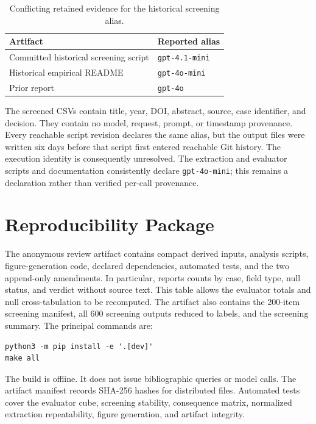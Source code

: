 \documentclass[acmsmall,anonymous,review]{acmart}
\begin{document}
\begin{table}[h]
\caption{Conflicting retained evidence for the historical screening alias.}
\label{tab:model-conflict}
\begin{tabularx}{\columnwidth}{Y l}
\toprule
\textbf{Artifact} & \textbf{Reported alias} \\
\midrule
Committed historical screening script & \texttt{gpt-4.1-mini} \\
Historical empirical README & \texttt{gpt-4o-mini} \\
Prior report & \texttt{gpt-4o} \\
\bottomrule
\end{tabularx}
\end{table}

The screened CSVs contain title, year, DOI, abstract, source, case identifier, and decision. They contain no model, request, prompt, or timestamp provenance. Every reachable script revision declares the same alias, but the output files were written six days before that script first entered reachable Git history. The execution identity is consequently unresolved. The extraction and evaluator scripts and documentation consistently declare \texttt{gpt-4o-mini}; this remains a declaration rather than verified per-call provenance.

\section{Reproducibility Package}

The anonymous review artifact contains compact derived inputs, analysis scripts, figure-generation code, declared dependencies, automated tests, and the two append-only amendments. In particular,  reports counts by case, field type, null status, and verdict without source text. This table allows the evaluator totals and null cross-tabulation to be recomputed. The artifact also contains the 200-item screening manifest, all 600 screening outputs reduced to labels, and the screening summary. The principal commands are:

\begin{verbatim}
python3 -m pip install -e '.[dev]'
make all
\end{verbatim}

The build is offline. It does not issue bibliographic queries or model calls. The artifact manifest records SHA-256 hashes for distributed files. Automated tests cover the evaluator cube, screening stability, consequence matrix, normalized extraction repeatability, figure generation, and artifact integrity.
\end{document}
